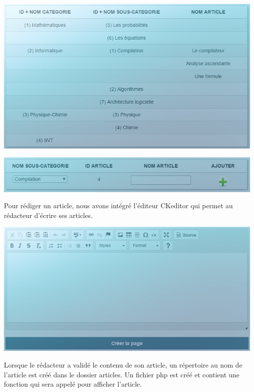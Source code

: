 \documentclass[hidelinks, 12pt,a4paper]{article}
\begin{document}
\begin{center}
\includegraphics[width=16cm]{images/ajoutart.png}\\
\end{center}

\begin{center}
\includegraphics[width=16cm]{images/ajoutart2.png}\\
\end{center}

Pour rédiger un article, nous avons intégré l'éditeur CKeditor qui permet au rédacteur d'écrire ses articles.

\begin{center}
\includegraphics[width=16cm]{images/ajoutart3.png}\\
\end{center}

Lorsque le rédacteur a validé le contenu de son article, un répertoire au nom de l'article est créé dans le dossier articles. Un fichier php est créé et contient une fonction qui sera appelé pour afficher l'article.
\end{document}
